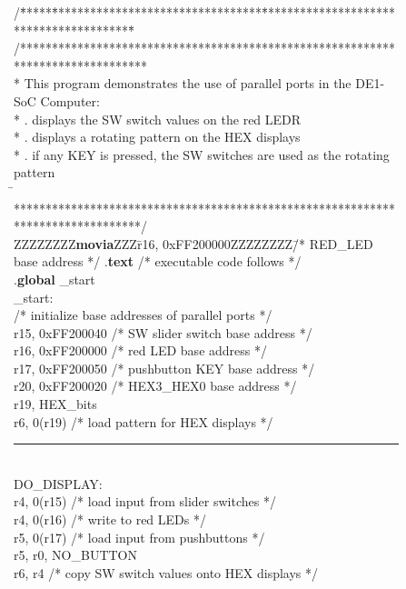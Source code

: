 \begin{figure}[h!]
\lstset{style=defaultNiosStyle}
\begin{center}
\begin{minipage}[t]{12.5 cm}
\begin{tabbing}
/\=*****\=*********************************\=****************************************\=\kill
/********************************************************************************\\
\>* This program demonstrates the use of parallel ports in the DE1-SoC Computer:\\
\>* . displays the SW switch values on the red LEDR\\
\>* . displays a rotating pattern on the HEX displays\\
\>* . if any KEY is pressed, the SW switches are used as the rotating pattern\\
\=\kill
\>********************************************************************************/\\
ZZZZZZZZ\={\bf movia}ZZZ\=r16, 0xFF200000ZZZZZZZZ\=/* RED\_LED base address */\kill
\>.{\bf text}	\>\>/* executable code follows */\\
\>.{\bf global} \>\_start\\
\_start:\\
\>/* initialize base addresses of parallel ports */\\
 \>r15, 0xFF200040 \>/* SW slider switch base address */\\
 \>r16, 0xFF200000 \>/* red LED base address */\\
 \>r17, 0xFF200050 \>/* pushbutton KEY base address */\\
 \>r20, 0xFF200020 \>/* HEX3\_HEX0 base address */\\
 \>r19, HEX\_bits\\
 \>r6, 0(r19) \>/* load pattern for HEX displays */\\
\rule{6.0in}{0in}~\\
DO\_DISPLAY:\\
 \>r4, 0(r15) \>/* load input from slider switches */\\
 \>r4, 0(r16) \>/* write to red LEDs */\\
 \>r5, 0(r17) \>/* load input from pushbuttons */\\
 \>r5, r0, NO\_BUTTON\\
 \>r6, r4 \>/* copy SW switch values onto HEX displays */\\

\end{tabbing}
\end{minipage}
\end{center}
\end{figure}
